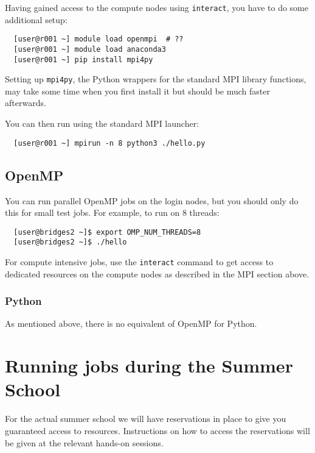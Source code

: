 \documentclass{article}
\begin{document}
Having gained access to the compute nodes using \texttt{interact}, you
have to do some additional setup:

\begin{verbatim}
  [user@r001 ~] module load openmpi  # ??
  [user@r001 ~] module load anaconda3
  [user@r001 ~] pip install mpi4py
\end{verbatim}

Setting up \texttt{mpi4py}, the Python wrappers for the standard MPI
library functions, may take some time when you first install it but
should be much faster afterwards.

You can then run using the standard MPI launcher:

\begin{verbatim}
  [user@r001 ~] mpirun -n 8 python3 ./hello.py
\end{verbatim}

\subsection{OpenMP}

You can run parallel OpenMP jobs on the login nodes, but you should
only do this for small test jobs. For example, to run on 8 threads:

\begin{verbatim}
  [user@bridges2 ~]$ export OMP_NUM_THREADS=8
  [user@bridges2 ~]$ ./hello
\end{verbatim}

For compute intensive jobs, use the \verb+interact+ command to get
access to dedicated resources on the compute nodes as described in the
MPI section above.

\subsubsection{Python}

As mentioned above, there is no equivalent of OpenMP for Python.

\section{{\label{sec:running2}}Running jobs during the Summer School}

For the actual summer school we will have reservations in place to
give you guaranteed access to resources. Instructions on how to access
the reservations will be given at the relevant hands-on sessions.
\end{document}
